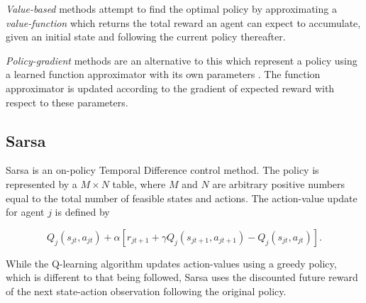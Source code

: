 \textit{Value-based} methods attempt to find the optimal policy by
approximating a \textit{value-function} which returns the total reward an
agent can expect to accumulate, given an initial state and following the
current policy thereafter.

\textit{Policy-gradient} methods are an alternative to this which
represent a policy using a learned function approximator with its own
parameters \cite{Sutton99policygradient}.  The function approximator is updated
according to the gradient of expected reward with respect to these parameters.

\subsection{Sarsa}
Sarsa is an on-policy Temporal Difference control method.  The
policy is represented by a $M \times N$ table, where $M$ and $N$ are
arbitrary positive numbers equal to the total number of feasible states and
actions. The action-value update for agent $j$ is defined by

\begin{equation}
Q_j(s_{jt},a_{jt}) + \alpha [r_{jt+1} + \gamma Q_j(s_{jt+1},a_{jt+1}) -
Q_j(s_{jt},a_{jt})].
\end{equation}

While the Q-learning algorithm updates action-values using a greedy policy,
which is different to that being followed, Sarsa uses the discounted future
reward of the next state-action observation following the original policy.

